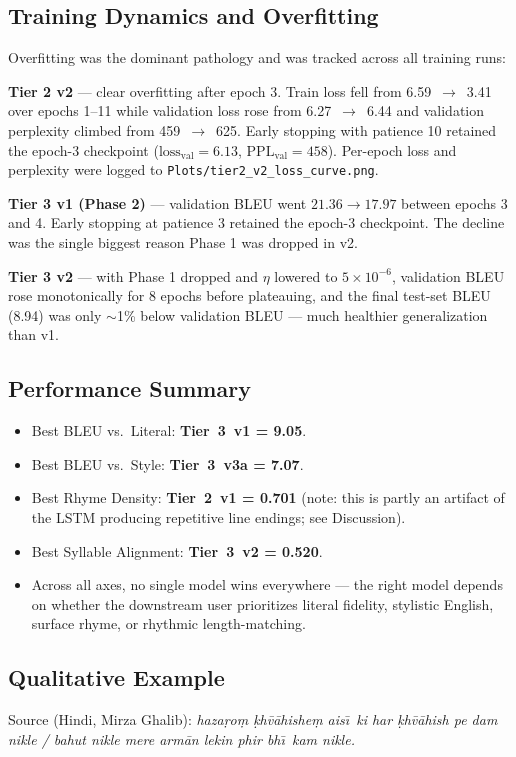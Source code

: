\documentclass[11pt]{article}
\begin{document}
\subsection{Training Dynamics and Overfitting}
Overfitting was the dominant pathology and was tracked across all training runs:

\textbf{Tier 2 v2} --- clear overfitting after epoch 3. Train loss fell from 6.59~$\rightarrow$~3.41 over epochs 1--11 while validation loss rose from 6.27~$\rightarrow$~6.44 and validation perplexity climbed from 459~$\rightarrow$~625. Early stopping with patience 10 retained the epoch-3 checkpoint ($\mathrm{loss}_{\text{val}}{=}6.13$, $\mathrm{PPL}_{\text{val}}{=}458$). Per-epoch loss and perplexity were logged to \texttt{Plots/tier2\_v2\_loss\_curve.png}.

\textbf{Tier 3 v1 (Phase 2)} --- validation BLEU went $21.36 \rightarrow 17.97$ between epochs 3 and 4. Early stopping at patience 3 retained the epoch-3 checkpoint. The decline was the single biggest reason Phase 1 was dropped in v2.

\textbf{Tier 3 v2} --- with Phase 1 dropped and $\eta$ lowered to $5{\times}10^{-6}$, validation BLEU rose monotonically for 8 epochs before plateauing, and the final test-set BLEU (8.94) was only $\sim$1\% below validation BLEU --- much healthier generalization than v1.

\subsection{Performance Summary}
\begin{itemize}[leftmargin=*,topsep=0pt]
  \item Best BLEU vs.\ Literal: \textbf{Tier~3~v1 = 9.05}.
  \item Best BLEU vs.\ Style: \textbf{Tier~3~v3a = 7.07}.
  \item Best Rhyme Density: \textbf{Tier~2~v1 = 0.701} (note: this is partly an artifact of the LSTM producing repetitive line endings; see Discussion).
  \item Best Syllable Alignment: \textbf{Tier~3~v2 = 0.520}.
  \item Across all axes, no single model wins everywhere --- the right model depends on whether the downstream user prioritizes literal fidelity, stylistic English, surface rhyme, or rhythmic length-matching.
\end{itemize}

\subsection{Qualitative Example}
Source (Hindi, Mirza Ghalib): \emph{haza\d{r}o\d{m} \d{k}h\=v\=ahishe\d{m} ais\=\i\ ki har \d{k}h\=v\=ahish pe dam nikle / bahut nikle mere arm\=an lekin phir bh\=\i\ kam nikle.}
\end{document}
